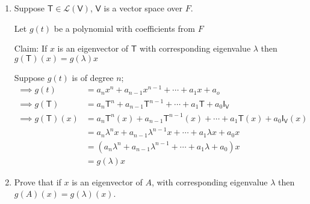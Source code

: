 \begin{enumerate}
\item Suppose $\mathsf{T} \in \mathcal{L}(\mathsf{V})$, $\mathsf{V}$
  is a vector space over $F$.

Let $g(t)$ be a polynomial with coefficients from $F$

Claim: If $x$ is an eigenvector of $\mathsf{T}$ with corresponding
eigenvalue $\lambda$ then $g(\mathsf{T})(x) = g(\lambda)x$

Suppose $g(t)$ is of degree $n$;
\begin{align}
\implies g(t) &= a_nx^n +a_{n-1}x^{n-1} +\dotsb+ a_1x + a_o\\
\implies g(\mathsf{T}) &= a_n\mathsf{T}^n + a_{n-1}\mathsf{T}^{n-1}
+\dotsb + a_1\mathsf{T} +a_0\mathsf{I}_{\mathsf{V}}\\
\implies g(\mathsf{T}) (x)&= a_n\mathsf{T}^n(x) + a_{n-1}\mathsf{T}^{n-1}(x)
+\dotsb + a_1\mathsf{T}(x) +a_0\mathsf{I}_{\mathsf{V}}(x)\\
&=a_n\lambda^nx +a_{n-1}\lambda^{n-1}x +\dotsb +a_1\lambda x+ a_0x\\
&=(a_n\lambda^n +a_{n-1}\lambda^{n-1} +\dotsb +a_1\lambda + a_0)x\\
&=g(\lambda)x
\end{align}
\item Prove that if $x$ is an eigenvector of $A$, with corresponding
  eigenvalue $\lambda$ then $g(A)(x) = g(\lambda)(x)$.


\end{enumerate}
